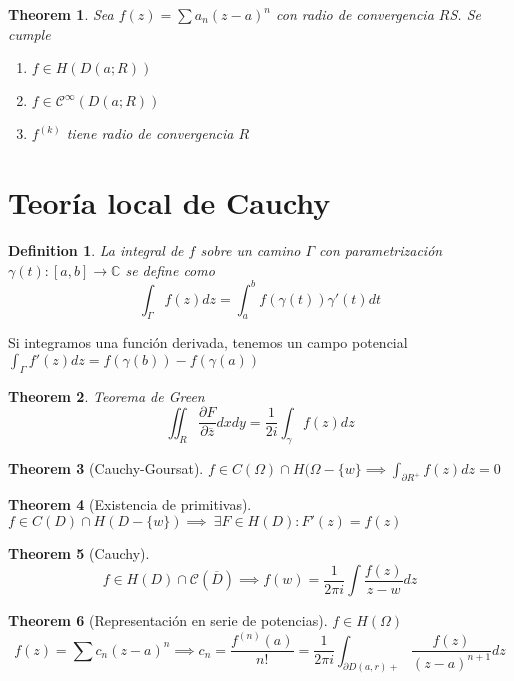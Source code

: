 \documentclass[leqno]{article}
\newtheorem*{definition}{Definition}
\newtheorem*{theorem}{Theorem}
\begin{document}
\begin{theorem}
Sea $f(z) = \sum a_n(z-a)^n$ con radio de convergencia $R$S. Se cumple
 \begin{enumerate}[topsep=-6pt, itemsep=0pt]
  \item $f\in H(D(a;R))$
  \item $f\in \mathcal{C}^\infty(D(a;R))$ 
  \item $f^{(k)}$ tiene radio de convergencia $R$
\end{enumerate}
\end{theorem}

\section{Teoría local de Cauchy}
\begin{definition}
La integral de $f$ sobre un camino $\Gamma$ con parametrización $\gamma(t):[a, b]\to \mathbb{C}$ se define como
\[
\int_\Gamma f(z)dz = \int_a^b f(\gamma(t))\gamma'(t)dt
\] 
\end{definition}

Si integramos una función derivada, tenemos un campo potencial $\int_\Gamma f'(z)dz = f(\gamma(b))-f(\gamma(a)) $

\begin{theorem}
Teorema de Green
\[
  \iint_R \frac{\partial F}{\partial \overline{z}}dxdy = \frac{1}{2i}\int_\gamma f(z)dz
\] 
\end{theorem}

\begin{theorem}[Cauchy-Goursat]
$f\in C(\Omega )\cap H(\Omega -\{w\} \implies \displaystyle \int_{\partial R^+} f(z)dz=0$
\end{theorem}

\begin{theorem}[Existencia de primitivas]
$f\in C(D)\cap H(D-\{w\}) \implies \ \exists F\in H(D): F'(z) = f(z)$
\end{theorem}

\begin{theorem}[Cauchy]
\[
f\in H(D)\cap \mathcal{C}(\overline{D}) \implies f(w) = \frac{1}{2\pi i}\int \frac{f(z)}{z-w}dz
\] 
\end{theorem}

\begin{theorem}[Representación en serie de potencias] $f\in H(\Omega )$
\[
f(z) = \sum c_n(z-a)^n \implies c_n = \frac{f^{(n)}(a)}{n!} = \frac{1}{2\pi i} \int_{\partial D(a, r)+} \frac{f(z)}{(z-a)^{n+1}}dz
\] 
\end{theorem}
\end{document}
